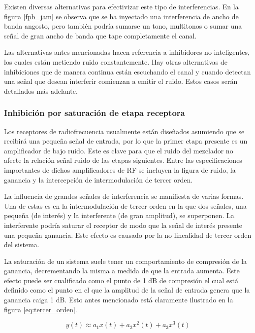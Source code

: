 \documentclass[12pt]{report}
\begin{document}
Existen diversas alternativas para efectivizar este tipo de interferencias. En la figura \ref{fpb_jam} se observa que se ha inyectado una
interferencia de ancho de banda angosto, pero también podría sumarse un tono, multitonos o sumar una señal de gran ancho de banda que 
tape completamente el canal. \par
Las alternativas antes mencionadas hacen referencia a inhibidores no inteligentes, los cuales están metiendo ruido constantemente. Hay otras 
alternativas de inhibiciones que de manera continua están escuchando el canal y cuando detectan una señal que 
desean interferir comienzan a emitir el ruido. Estos casos serán detallados más adelante.

\subsubsection{Inhibición por saturación de etapa receptora}

Los receptores de radiofrecuencia usualmente están diseñados asumiendo que se recibirá una pequeña señal de entrada, por lo que la primer
etapa presente es un amplificador de bajo ruido.  Este es clave para que el ruido del mezclador no afecte la relación señal ruido de las 
etapas siguientes. Entre las especificaciones importantes de dichos amplificadores de RF se incluyen la figura de ruido, la ganancia y la 
intercepción de intermodulación de tercer orden.\par \todo[inline, inlinewidth=4cm, noinlinepar]{[6]-[7]}
La influencia de grandes señales de interferencia se manifiesta de varias formas. Una de estas es en la intermodulación de tercer orden en 
la que dos señales, una pequeña (de interés) y la interferente (de gran amplitud), se superponen. La interferente podría saturar el receptor
de modo que la señal de interés presente una pequeña ganancia. Este efecto es causado por la no linealidad de tercer orden del sistema.

La saturación de un sistema suele tener un comportamiento de compresión  de la ganancia, decrementando la misma a medida de que la entrada aumenta.
Este efecto puede ser cualificado como el punto de 1 dB de compresión el cual está definido como el punto en el que la amplitud de la señal de 
entrada genera que la ganancia caiga 1 dB. Esto antes mencionado está claramente ilustrado en la figura \ref{eq:tercer_orden}.

\begin{equation}\label{eq:tercer_orden}
    y(t) \approx  a_1 x(t) + a_2 x^{2}(t) + a_3 x^{3}(t) 
\end{equation}
\end{document}
